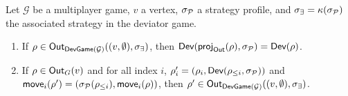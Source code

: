 \begin{lemma}\label{13-prop:correctness-deviator-game}
  Let $\mathcal{G}$ be a multiplayer game, $v$ a vertex, \(\sigma_{\mathcal{P}}\) a
  strategy profile, and \(\sigma_{\exists} = \kappa(\sigma_{\mathcal{P}})\) the
  associated strategy in the deviator game.

  \begin{enumerate}
  \item     If \(\rho \in \textsf{Out}_{\textsf{DevGame}(\mathcal{G})}((v,\emptyset),\sigma_\exists)\), then
    \(\textsf{Dev}(\textsf{proj}_{\textsf{Out}}(\rho), \sigma_{\mathcal{P}} ) = \textsf{Dev}(\rho)\).
  \item     If \(\rho \in \textsf{Out}_G(v)\) and for all index \(i\),
    \(\rho'_i = (\rho_i , \textsf{Dev}(\rho_{\le i} , \sigma_{\mathcal{P}}))\) and
    \(\textsf{move}_i(\rho') = (\sigma_{\mathcal{P}} (\rho_{\le i} ), \textsf{move}_i(\rho))\), then
    \(\rho' \in \textsf{Out}_{\textsf{DevGame}(\mathcal{G})}((v,\emptyset), \sigma_\exists)\).
  \end{enumerate}
\end{lemma}
